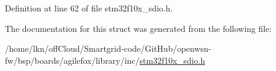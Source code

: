 Definition at line 62 of file stm32f10x\+\_\+sdio.\+h.



The documentation for this struct was generated from the following file\+:\begin{DoxyCompactItemize}
\item 
/home/lkn/off\+Cloud/\+Smartgrid-\/code/\+Git\+Hub/openwsn-\/fw/bsp/boards/agilefox/library/inc/\hyperlink{agilefox_2library_2inc_2stm32f10x__sdio_8h}{stm32f10x\+\_\+sdio.\+h}\end{DoxyCompactItemize}

